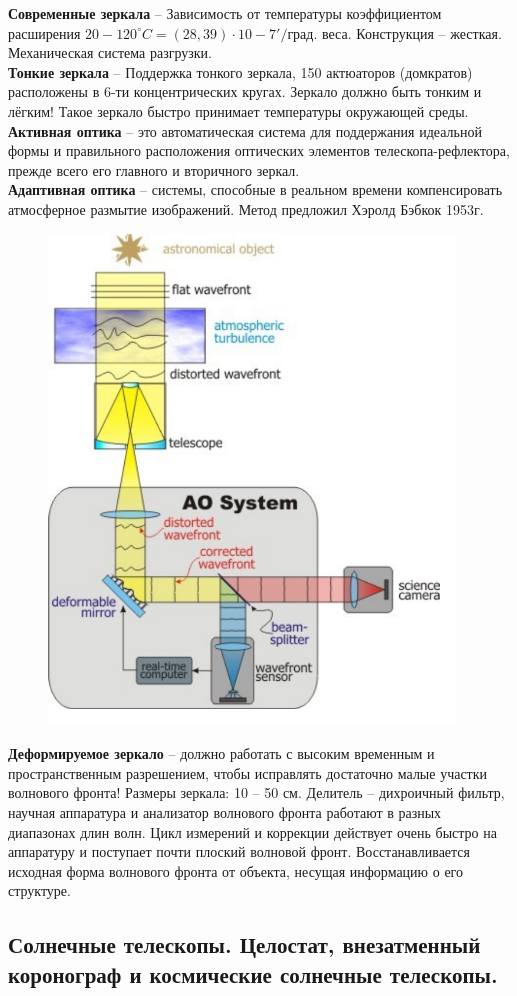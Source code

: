 \documentclass[12pt]{article}
\begin{document}
	
	\textbf{Современные зеркала} -- Зависимость от температуры	коэффициентом расширения $20-120^{\circ}C=(28,39)\cdot10-7'/$град. веса.	Конструкция -- жесткая.	Механическая система
	разгрузки. \\
	\textbf{Тонкие зеркала} -- Поддержка тонкого зеркала, 150
	актюаторов (домкратов) расположены в 6-ти концентрических кругах. Зеркало должно быть тонким и лёгким!	Такое зеркало быстро принимает температуры окружающей среды. \newpage
		\textbf{Активная оптика} -- это автоматическая система для поддержания идеальной формы и правильного расположения оптических элементов телескопа-рефлектора,	прежде всего его главного и вторичного
		зеркал.\\
		\textbf{Адаптивная оптика} -- системы, способные в реальном времени компенсировать атмосферное размытие изображений. Метод предложил Хэролд Бэбкок 1953г.
		
		
\begin{figure}[h]
	\centering
	\includegraphics[width=0.5\linewidth]{"Снимок экрана от 2024-12-23 15-06-13"}
\end{figure}
	
	\textbf{Деформируемое зеркало} -- должно работать с высоким временным и пространственным разрешением, чтобы исправлять достаточно	малые участки волнового фронта! Размеры зеркала: 10 – 50 см. Делитель -- дихроичный фильтр, научная аппаратура и анализатор волнового фронта работают в разных диапазонах длин волн. Цикл измерений и коррекции действует очень быстро на аппаратуру и	поступает почти плоский волновой фронт. Восстанавливается исходная форма волнового фронта от объекта, несущая информацию о его структуре.
	
	\subsection{Солнечные телескопы. Целостат, внезатменный коронограф и космические солнечные телескопы.}
	
\end{document}
